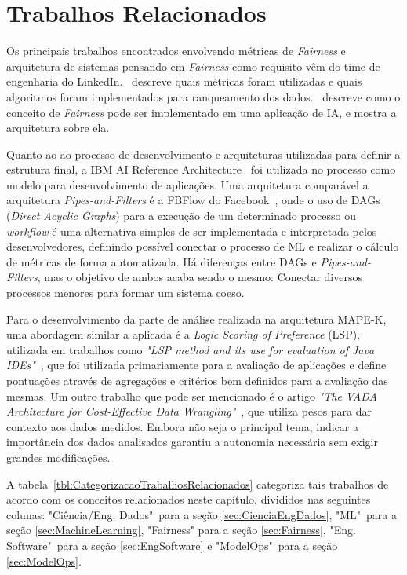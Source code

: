 \documentclass[portugues]{ic-tese}
\begin{document}
\section{Trabalhos Relacionados}
\label{sec:TrabalhosRelacionados}

Os principais trabalhos encontrados envolvendo métricas de \textit{Fairness} e arquitetura de sistemas pensando em \textit{Fairness} como requisito vêm do time de engenharia do LinkedIn.~\citet{Geyik_2019} descreve quais métricas foram utilizadas e quais algoritmos foram implementados para ranqueamento dos dados.~\citet{Kenthapadi_2019} descreve como o conceito de \textit{Fairness} pode ser implementado em uma aplicação de IA, e mostra a arquitetura sobre ela.

Quanto ao ao processo de desenvolvimento e arquiteturas utilizadas para definir a estrutura final, a IBM AI Reference Architecture~\citep{IBM_2021} foi utilizada no processo como modelo para desenvolvimento de aplicações. Uma arquitetura comparável a arquitetura \textit{Pipes-and-Filters} é a FBFlow do Facebook~\citep{Dunn_2016}, onde o uso de DAGs (\textit{Direct Acyclic Graphs}) para a execução de um determinado processo ou \textit{workflow} é uma alternativa simples de ser implementada e interpretada pelos desenvolvedores, definindo possível conectar o processo de ML e realizar o cálculo de métricas de forma automatizada. Há diferenças entre DAGs e \textit{Pipes-and-Filters}, mas o objetivo de ambos acaba sendo o mesmo: Conectar diversos processos menores para formar um sistema coeso.

Para o desenvolvimento da parte de análise realizada na arquitetura MAPE-K, uma abordagem similar a aplicada é a \textit{Logic Scoring of Preference} (LSP), utilizada em trabalhos como \textit{"LSP method and its use for evaluation of Java IDEs"}~\citep{Dujmovic_2006}, que foi utilizada primariamente para a avaliação de aplicações e define pontuações através de agregações e critérios bem definidos para a avaliação das mesmas. Um outro trabalho que pode ser mencionado é o artigo \textit{"The VADA Architecture for Cost-Effective Data Wrangling"}~\citep{Konstantinou_2017}, que utiliza pesos para dar contexto aos dados medidos. Embora não seja o principal tema, indicar a importância dos dados analisados garantiu a autonomia necessária sem exigir grandes modificações.

A tabela~\ref{tbl:CategorizacaoTrabalhosRelacionados} categoriza tais trabalhos de acordo com os conceitos relacionados neste capítulo, divididos nas seguintes colunas: "Ciência/Eng. Dados"~para a seção \ref{sec:CienciaEngDados}, "ML"~para a seção \ref{sec:MachineLearning}, "Fairness" para a seção \ref{sec:Fairness}, "Eng. Software"~para a seção \ref{sec:EngSoftware} e "ModelOps"~para a seção \ref{sec:ModelOps}.
\end{document}
